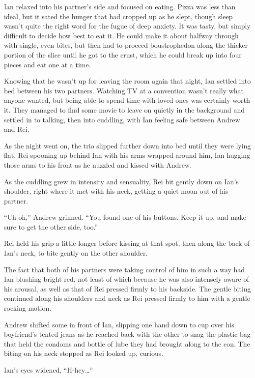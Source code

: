 Ian relaxed into his partner's side and focused on eating. Pizza was less than ideal, but it sated the hunger that had cropped up as he slept, though sleep wasn't quite the right word for the fugue of deep anxiety. It was tasty, but simply difficult to decide how best to eat it. He could make it about halfway through with single, even bites, but then had to proceed boustrophedon along the thicker portion of the slice until he got to the crust, which he could break up into four pieces and eat one at a time.

Knowing that he wasn't up for leaving the room again that night, Ian settled into bed between his two partners. Watching TV at a convention wasn't really what anyone wanted, but being able to spend time with loved ones was certainly worth it. They managed to find some movie to leave on quietly in the background and settled in to talking, then into cuddling, with Ian feeling safe between Andrew and Rei.

As the night went on, the trio slipped further down into bed until they were lying flat, Rei spooning up behind Ian with his arms wrapped around him, Ian hugging those arms to his front as he nuzzled and kissed with Andrew.

As the cuddling grew in intensity and sensuality, Rei bit gently down on Ian's shoulder, right where it met with his neck, getting a quiet moan out of his partner.

``Uh-oh,'' Andrew grinned. ``You found one of his buttons. Keep it up, and make sure to get the other side, too.''

Rei held his grip a little longer before kissing at that spot, then along the back of Ian's neck, to bite gently on the other shoulder.

The fact that both of his partners were taking control of him in such a way had Ian blushing bright red, not least of which because he was also intensely aware of his arousal, as well as that of Rei pressed firmly to his backside. The gentle biting continued along his shoulders and neck as Rei pressed firmly to him with a gentle rocking motion.

Andrew shifted some in front of Ian, slipping one hand down to cup over his boyfriend's tented jeans as he reached back with the other to snag the plastic bag that held the condoms and bottle of lube they had brought along to the con. The biting on his neck stopped as Rei looked up, curious.

Ian's eyes widened, ``H-hey\ldots{}''

